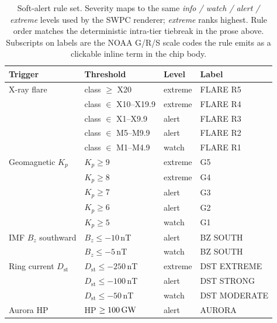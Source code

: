 \documentclass[11pt,a4paper]{article}
\newcommand{\SI}[2]{#1\,\text{#2}}
\newcommand{\GW}{\text{GW}}
\begin{document}
\begin{table}[H]
\centering
\caption{Soft-alert rule set.  Severity maps to the same
         \emph{info / watch / alert / extreme} levels used by
         the SWPC renderer; \emph{extreme} ranks highest.  Rule
         order matches the deterministic intra-tier tiebreak in
         the prose above.  Subscripts on labels are the NOAA
         G/R/S scale codes the rule emits as a clickable
         inline term in the chip body.}
\label{tab:soft-alerts}
\begin{tabular}{@{}l l l l@{}}
\toprule
\textbf{Trigger} & \textbf{Threshold} & \textbf{Level} & \textbf{Label} \\
\midrule
X-ray flare                  & class $\ge$ X20            & extreme & FLARE R5 \\
                             & class $\in$ X10--X19.9     & extreme & FLARE R4 \\
                             & class $\in$ X1--X9.9       & alert   & FLARE R3 \\
                             & class $\in$ M5--M9.9       & alert   & FLARE R2 \\
                             & class $\in$ M1--M4.9       & watch   & FLARE R1 \\
\midrule
Geomagnetic $K_p$            & $K_p \ge 9$                & extreme & G5 \\
                             & $K_p \ge 8$                & extreme & G4 \\
                             & $K_p \ge 7$                & alert   & G3 \\
                             & $K_p \ge 6$                & alert   & G2 \\
                             & $K_p \ge 5$                & watch   & G1 \\
\midrule
IMF $B_z$ southward          & $B_z \le -10$\,nT          & alert   & BZ SOUTH \\
                             & $B_z \le -5$\,nT           & watch   & BZ SOUTH \\
\midrule
Ring current $D_{\text{st}}$ & $D_{\text{st}} \le -250$\,nT & extreme & DST EXTREME \\
                             & $D_{\text{st}} \le -100$\,nT & alert   & DST STRONG \\
                             & $D_{\text{st}} \le -50$\,nT  & watch   & DST MODERATE \\
\midrule
Aurora HP                    & HP $\ge \SI{100}{\GW}$     & alert   & AURORA \\

\end{tabular}
\end{table}
\end{document}
